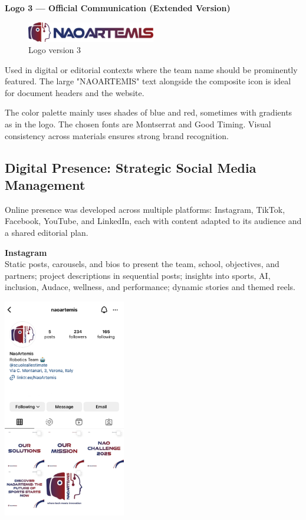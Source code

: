 \documentclass{optica-article}
\begin{document}
\textbf{Logo 3 — Official Communication (Extended Version)}\\
\begin{figure}[H]
    \centering
    \includegraphics[width=0.5\textwidth]{figures/logo_v3.png}
    \caption{Logo version 3}
    \label{fig:logo_v3}
\end{figure}
Used in digital or editorial contexts where the team name should be prominently featured. The large "NAOARTEMIS" text alongside the composite icon is ideal for document headers and the website.

The color palette mainly uses shades of blue and red, sometimes with gradients as in the logo. The chosen fonts are Montserrat and Good Timing. Visual consistency across materials ensures strong brand recognition.

\subsection{Digital Presence: Strategic Social Media Management}
Online presence was developed across multiple platforms: Instagram, TikTok, Facebook, YouTube, and LinkedIn, each with content adapted to its audience and a shared editorial plan.

\textbf{Instagram}\\
Static posts, carousels, and bios to present the team, school, objectives, and partners; project descriptions in sequential posts; insights into sports, AI, inclusion, Audace, wellness, and performance; dynamic stories and themed reels.

\begin{center}
    \includegraphics[width=0.4\textwidth]{figures/instagram.jpg}
\end{center}
\end{document}
